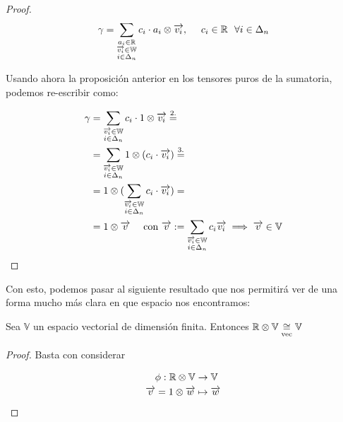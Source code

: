 \begin{ejemplo}
\begin{proof}
        \begin{equation}
            \gamma = \sum_{\substack{a_i \in \mathbb{R}\\ \overrightarrow{v_i} \in \mathbb{W}\\ i \in \Delta_{n}}} c_{i} \cdot a_i \otimes \overrightarrow{v_i}, \ \ \ \  c_{i} \in \mathbb{R} \ \  \forall i \in \Delta_{n}
        \end{equation}

        Usando ahora la proposición anterior en los tensores puros de la sumatoria, podemos re-escribir como:

        \begin{equation}
        \begin{split}
            \gamma &= \sum_{\substack{\overrightarrow{v_i} \in \mathbb{W}\\ i \in \Delta_{n}}} c_{i} \cdot 1 \otimes \overrightarrow{v_i} \stackrel{\text{2.}}{=} \\
            & = \sum_{\substack{\overrightarrow{v_i} \in \mathbb{W}\\ i \in \Delta_{n}}} 1 \otimes (c_{i} \cdot \overrightarrow{v_i}) \stackrel{\text{3.}}{=} \\
            & = 1 \otimes ( \sum_{\substack{\overrightarrow{v_i} \in \mathbb{W} \\ i \in \Delta_{n}}} c_{i} \cdot \overrightarrow{v_i} ) = \\
            & = 1 \otimes \overrightarrow{v} \ \ \ \  \text{con } \overrightarrow{v} := \sum_{\substack{\overrightarrow{v_i} \in \mathbb{W}\\ i \in \Delta_{n}}} c_{i} \overrightarrow{v_i} \implies \overrightarrow{v} \in \mathbb{V}
        \end{split}
        \end{equation}

    \end{proof}


    Con esto, podemos pasar al siguiente resultado que nos permitirá ver de una forma mucho más clara en que espacio nos encontramos:

    \begin{proposicion}
        Sea $\mathbb{V}$ un espacio vectorial de dimensión finita. Entonces $\mathbb{R} \otimes \mathbb{V} \underset{\text{vec}}{\cong} \mathbb{V}$
    \end{proposicion}
    \begin{proof}
        Basta con considerar

        \begin{equation}
        \begin{split}
            \phi: \mathbb{R} \otimes \mathbb{V} &\to \mathbb{V} \\
            \overrightarrow{v} = 1 \otimes \overrightarrow{w} &\mapsto \overrightarrow{w}
        \end{split}
        \end{equation}


\end{proof}
\end{ejemplo}
